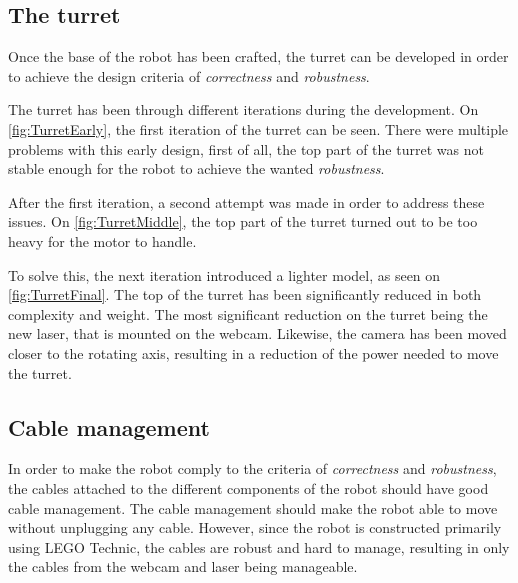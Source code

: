 \subsection{The turret}
Once the base of the robot has been crafted, the turret can be developed in order to achieve the design criteria of \textit{correctness} and \textit{robustness}. 

The turret has been through different iterations during the development. 
On \autoref{fig:TurretEarly}, the first iteration of the turret can be seen.
There were multiple problems with this early design, first of all, the top part of the turret was not stable enough for the robot to achieve the wanted \textit{robustness}.

After the first iteration, a second attempt was made in order to address these issues. 
On \autoref{fig:TurretMiddle}, the top part of the turret turned out to be too heavy for the motor to handle. 

To solve this, the next iteration introduced a lighter model, as seen on \autoref{fig:TurretFinal}.
The top of the turret has been significantly reduced in both complexity and weight. 
The most significant reduction on the turret being the new laser, that is mounted on the webcam.
Likewise, the camera has been moved closer to the rotating axis, resulting in a reduction of the power needed to move the turret. 

\subsection{Cable management}
In order to make the robot comply to the criteria of \textit{correctness} and \textit{robustness}, the cables attached to the different components of the robot should have good cable management. 
The cable management should make the robot able to move without unplugging any cable.
However, since the robot is constructed primarily using LEGO Technic, the cables are robust and hard to manage, resulting in only the cables from the webcam and laser being manageable. 
